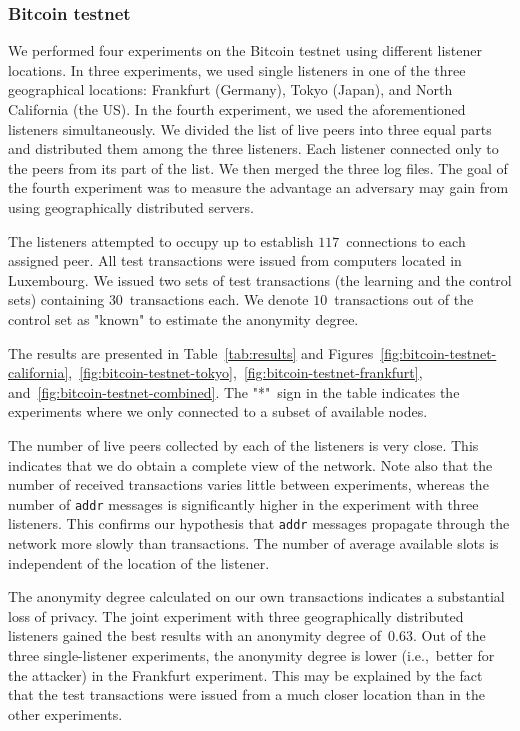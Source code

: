 \subsubsection{Bitcoin testnet}

We performed four experiments on the Bitcoin testnet using different listener locations.
In three experiments, we used single listeners in one of the three geographical locations: Frankfurt (Germany), Tokyo (Japan), and North California (the US).
In the fourth experiment, we used the aforementioned listeners simultaneously.
We divided the list of live peers into three equal parts and distributed them among the three listeners.
Each listener connected only to the peers from its part of the list.
We then merged the three log files.
The goal of the fourth experiment was to measure the advantage an adversary may gain from using geographically distributed servers.

The listeners attempted to occupy up to establish $117$~connections to each assigned peer.
All test transactions were issued from computers located in Luxembourg.
We issued two sets of test transactions (the learning and the control sets) containing $30$~transactions each.
We denote $10$~transactions out of the control set as "known" to estimate the anonymity degree.

The results are presented in Table~\ref{tab:results} and Figures~\ref{fig:bitcoin-testnet-california},~\ref{fig:bitcoin-testnet-tokyo},~\ref{fig:bitcoin-testnet-frankfurt}, and~\ref{fig:bitcoin-testnet-combined}.
The "*"~sign in the table indicates the experiments where we only connected to a subset of available nodes.

The number of live peers collected by each of the listeners is very close.
This indicates that we do obtain a complete view of the network.
Note also that the number of received transactions varies little between experiments, whereas the number of \texttt{addr} messages is significantly higher in the experiment with three listeners.
This confirms our hypothesis that \texttt{addr} messages propagate through the network more slowly than transactions.
The number of average available slots is independent of the location of the listener.

The anonymity degree calculated on our own transactions indicates a substantial loss of privacy.
The joint experiment with three geographically distributed listeners gained the best results with an anonymity degree of~$0.63$.
Out of the three single-listener experiments, the anonymity degree is lower (i.e.,~better for the attacker) in the Frankfurt experiment.
This may be explained by the fact that the test transactions were issued from a much closer location than in the other experiments.


